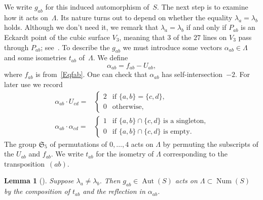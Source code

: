 \documentclass[11pt]{article}
\newtheorem{lemm}[theo]{Lemma}
\theoremstyle{definition}
\numberwithin{equation}{section}
\numberwithin{figure}{section}
\numberwithin{table}{section}
\newcommand*\sset{\subset}
\DeclareMathOperator{\Aut}{Aut}
\DeclareMathOperator{\Num}{Num}
\newcommand{\frakS}{\mathfrak{S}}
\begin{document}
We write $g_{ab}$ for this induced automorphism of~$S$. The next step is to examine how it acts on~$\Lambda$. Its nature turns out to depend on whether the equality $\lambda_a=\lambda_b$ holds. Although we don't need it, we remark that $\lambda_a=\lambda_b$ if and only if $P_{ab}$ is an Eckardt point of the cubic surface $V_3$, meaning that $3$ of the $27$ lines on $V_3$ pass through $P_{ab}$; see~\cite[Example~9.1.25]{CAG}. To describe the $g_{ab}$ we must introduce some vectors $\alpha_{ab}\in\Lambda$ and some isometries $t_{ab}$ of~$\Lambda$. We define
\begin{equation}\label{Eqalphaab}
\alpha_{ab}=f_{ab}-U_{ab},
\end{equation}
where $f_{ab}$ is from~\eqref{Eqfab}. One can check that $\alpha_{ab}$ has self-intersection~$-2$. For later use we record
\begingroup
\allowdisplaybreaks
\begin{align}\label{EqUdotAlpha}
\alpha_{ab}\cdot U_{cd}={}&
\begin{cases}
2&\text{if }\{a,b\}=\{c,d\},\\
0&\text{otherwise,}
\end{cases}
\\\label{EqAlphaDotAlpha}
\alpha_{ab}\cdot \alpha_{cd}={}&
\begin{cases}
1&\text{if }\{a,b\}\cap\{c,d\}\text{ is a singleton,}\\
0&\text{if }\{a,b\}\cap\{c,d\}\text{ is empty.}
\end{cases}
\end{align}
\endgroup
The group $\frakS_5$ of permutations of $0,\dots,4$ acts on $\Lambda$ by permuting the subscripts of the $U_{ab}$ and $f_{ab}$. We write $t_{ab}$ for the isometry of $\Lambda$ corresponding to the transposition~$(ab)$.

\begin{lemm}[{\cite[Corollary~4.3]{DolgachevSalem}}]\label{L2.3}
Suppose $\lambda_a\neq\lambda_b$. Then $g_{ab}\in\Aut(S)$ acts on $\Lambda\sset\Num(S)$ by the composition of $t_{ab}$ and the reflection in $\alpha_{ab}$.
\end{lemm}
\end{document}
